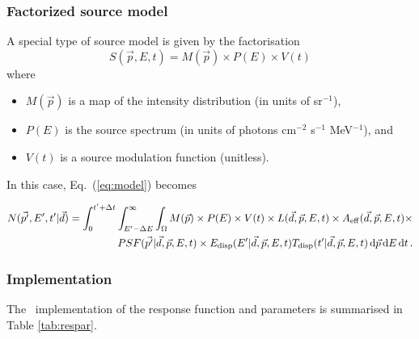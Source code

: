 \documentclass{article}[12pt,a4]
\begin{document}
\subsubsection{Factorized source model}

A special type of source model is given by the factorisation
\begin{equation}
S(\vec{p}, E, t) = M(\vec{p}) \times P(E) \times V(t)
\end{equation}
where
\begin{itemize}
\item[] $M(\vec{p})$ is a map of the intensity distribution (in units of sr$^{-1}$),
\item[] $P(E)$ is the source spectrum (in units of photons cm$^{-2}$ s$^{-1}$ MeV$^{-1}$), and
\item[] $V(t)$ is a source modulation function (unitless).
\end{itemize}
In this case, Eq.~(\ref{eq:model}) becomes

\begin{eqnarray}
N(\vec{p'}, E', t' | \vec{d}) = \int_{0}^{t'+\Delta t} \int_{E'-\Delta E}^{\infty} \int_{\Omega} 
M(\vec{p}) \times P(E) \times V(t) \times 
L(\vec{d}, \vec{p}, E, t) \times
A_{\rm eff}(\vec{d}, \vec{p}, E, t) \times \nonumber \\
PSF(\vec{p'} | \vec{d}, \vec{p}, E, t) \times
E_{\rm disp}(E' | \vec{d}, \vec{p}, E, t) 
T_{\rm disp}(t' | \vec{d}, \vec{p}, E, t) 
\, {\rm d}\vec{p} \, {\rm d}E \, {\rm d}t \, .
\end{eqnarray}


\subsubsection{Implementation}

The \this\ implementation of the response function and parameters is summarised in 
Table \ref{tab:respar}.
\end{document}
